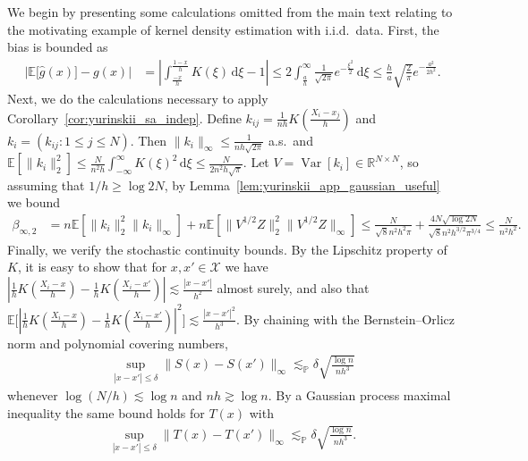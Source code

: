 \documentclass[11pt,lof]{puthesis}
\renewcommand{\P}{\ensuremath{\mathbb{P}}}
\newcommand{\R}{\ensuremath{\mathbb{R}}}
\newcommand{\E}{\ensuremath{\mathbb{E}}}
\newcommand{\cX}{\ensuremath{\mathcal{X}}}
\DeclareMathOperator{\Var}{Var}
\newcommand{\diff}[1]{\,\mathrm{d}#1}
\theoremstyle{break}
\theoremstyle{proof}
\begin{document}
We begin by presenting some calculations omitted from the main text
relating to the motivating example of kernel density estimation with
i.i.d.\ data.
First, the bias is bounded as
%
\begin{align*}
\big| \E \big[ \hat g(x) \big] - g(x) \big|
&=
\left|
\int_{\frac{-x}{h}}^{\frac{1-x}{h}}
K(\xi)
\diff \xi
- 1
\right|
\leq
2 \int_{\frac{a}{h}}^\infty
\frac{1}{\sqrt{2 \pi}}
e^{-\frac{\xi^2}{2}}
\diff \xi
\leq
\frac{h}{a}
\sqrt{\frac{2}{\pi}}
e^{-\frac{a^2}{2 h^2}}.
\end{align*}
%
Next, we do the calculations necessary to apply
Corollary~\ref{cor:yurinskii_sa_indep}.
Define $k_{i j} = \frac{1}{n h} K \left( \frac{X_i - x_j}{h} \right)$ and
$k_i = (k_{i j} : 1 \leq j \leq N)$.
Then $\|k_i\|_\infty \leq \frac{1}{n h \sqrt{2 \pi}}$ a.s.\ and
$\E[\|k_i\|_2^2] \leq \frac{N}{n^2 h} \int_{-\infty}^\infty K(\xi)^2 \diff \xi
\leq \frac{N}{2 n^2 h \sqrt{\pi}}$.
Let $V = \Var[k_i] \in \R^{N \times N}$,
so assuming that $1/h \geq \log 2 N$,
by Lemma~\ref{lem:yurinskii_app_gaussian_useful} we bound
%
\begin{align*}
\beta_{\infty,2}
&=
n \E\left[\| k_i \|^2_2 \| k_i \|_\infty
\right]
+ n \E \left[ \|V^{1/2} Z \|^2_2 \|V^{1/2} Z \|_\infty \right]
\leq
\frac{N}{\sqrt{8} n^2 h^2 \pi}
+ \frac{4 N \sqrt{\log 2 N}}{\sqrt{8} n^2 h^{3/2} \pi^{3/4}}
\leq
\frac{N}{n^2 h^2}.
\end{align*}
%
Finally, we verify the stochastic continuity bounds.
By the Lipschitz property of $K$, it is easy to show that
for $x,x' \in \cX$ we have
$\left|\frac{1}{h} K \left( \frac{X_i - x}{h} \right)
- \frac{1}{h} K \left( \frac{X_i - x'}{h} \right)\right|
\lesssim \frac{|x-x'|}{h^2}$ almost surely, and also that
$\E \Big[ \left|\frac{1}{h} K \left( \frac{X_i - x}{h} \right)
- \frac{1}{h} K \left( \frac{X_i - x'}{h} \right)\right|^2 \Big]
\lesssim \frac{|x-x'|^2}{h^3}$.
By chaining with the Bernstein--Orlicz norm and polynomial covering numbers,
%
\begin{align*}
\sup_{|x-x'| \leq \delta}
\big\|S(x) - S(x')\big\|_\infty
\lesssim_\P
\delta
\sqrt{\frac{\log n}{n h^3}}
\end{align*}
%
whenever $\log(N/h) \lesssim \log n$ and $n h \gtrsim \log n$.
By a Gaussian process maximal inequality
\citep[Corollary~2.2.8]{van1996weak}
the same bound holds for $T(x)$ with
%
\begin{align*}
\sup_{|x-x'| \leq \delta}
\big\|T(x) - T(x')\big\|_\infty
\lesssim_\P
\delta
\sqrt{\frac{\log n}{n h^3}}.
\end{align*}
\end{document}
